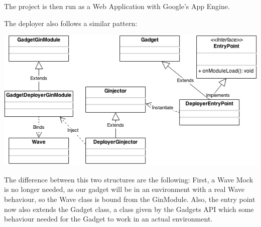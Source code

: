 The project is then run as a Web Application with Google's App Engine.

The deployer also follows a similar pattern:

\begin{center}
\includegraphics[keepaspectratio, scale=0.5]{Media/Diagrams/Gadget/Deployer.png}
\end{center}

The difference between this two structures are the following: First, a Wave Mock is no longer needed, as our gadget will be in an environment with a real Wave behaviour, so the Wave class is bound from the GinModule. Also, the entry point now also extends the Gadget class, a class given by the Gadgets API which some behaviour needed for the Gadget to work in an actual environment.








